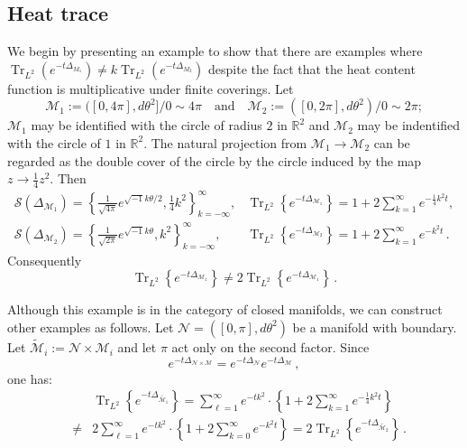 \documentclass{amsart}
\begin{document}
\subsection{Heat trace}\label{sect-2.3}
We begin by presenting an example to show that there are
examples where $\operatorname{Tr}_{L^2}(e^{-t\Delta_{M_1}})\ne k\operatorname{Tr}_{L^2}(e^{-t\Delta_{M_2}})$
despite the fact that the heat content function is multiplicative under finite coverings. Let 
$$\mathcal{M}_1:=([0,4\pi],d\theta^2]/0\sim4\pi
\quad\text{and}\quad
\mathcal{M}_2:=([0,2\pi],d\theta^2)/0\sim2\pi;$$
$\mathcal{M}_1$ may be identified with the circle of radius $2$ in $\mathbb{R}^2$ and $\mathcal{M}_2$
may be indentified with the circle of $1$ in $\mathbb{R}^2$. The natural projection from
$\mathcal{M}_1\rightarrow\mathcal{M}_2$ can be regarded as the double cover of the circle by the circle
induced by the map $z\rightarrow\frac14z^2$. Then
$$\begin{array}{ll}
\textstyle\mathcal{S}(\Delta_{\mathcal{M}_1})=
   \left\{\frac1{\sqrt{4\pi}}e^{\sqrt{-1}k\theta/2},\frac14k^2\right\}_{k=-\infty}^\infty,&
\displaystyle  \operatorname{Tr}_{L^2}\left\{e^{-t\Delta_{\mathcal{M}_1}}\right\}=1+2\sum_{k=1}^\infty
e^{-\frac14k^2t},\\
\textstyle\mathcal{S}(\Delta_{\mathcal{M}_2})=
   \left\{\frac1{\sqrt{2\pi}}e^{\sqrt{-1}k\theta},k^2\right\}_{k=-\infty}^\infty,&
\displaystyle
\operatorname{Tr}_{L^2}\left\{e^{-t\Delta_{\mathcal{M}_2}}\right\}=1+2\sum_{k=1}^\infty e^{-k^2t}\,.
\end{array}$$
Consequently 
$$\operatorname{Tr}_{L^2}\left\{e^{-t\Delta_{\mathcal{M}_1}}\right\}\ne
2\operatorname{Tr}_{L^2}\left\{e^{-t\Delta_{\mathcal{M}_1}}\right\}\,.
$$

Although this example is in the category of closed
manifolds, we can construct other examples as follows. Let $\mathcal{N}=([0,\pi],d\theta^2)$ be a manifold
with boundary. Let
$\tilde{\mathcal{M}}_i:=\mathcal{N}\times\mathcal{M}_i$ and let $\pi$ act only on the second factor. Since
$$e^{-t\Delta_{\mathcal{N}\times\mathcal{M}}}=e^{-t\Delta_{\mathcal{N}}}e^{-t\Delta_{\mathcal{M}}}\,,$$
one has:
\begin{eqnarray*}
&&\operatorname{Tr}_{L^2}\left\{e^{-t\Delta_{\tilde{\mathcal{M}_1}}}\right\}
=\sum_{\ell=1}^\infty e^{-tk^2}\cdot\left\{1+2\sum_{k=1}^\infty e^{-\frac14k^2t}\right\}\\
&\ne&
2\sum_{\ell=1}^\infty e^{-tk^2}\cdot\left\{1+2\sum_{k=0}^\infty e^{-k^2t}\right\}
=2\operatorname{Tr}_{L^2}\left\{e^{-t\Delta_{\tilde{\mathcal{M}_2}}}\right\}\,.
\end{eqnarray*}
\end{document}
